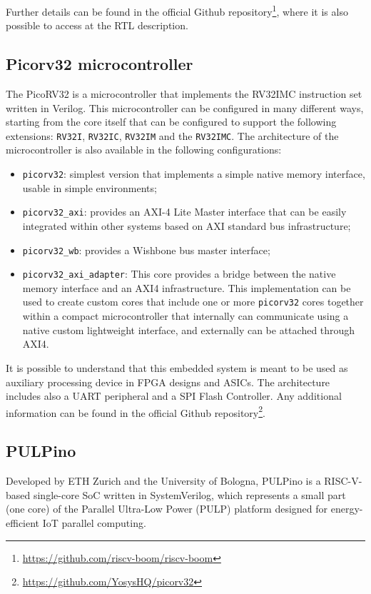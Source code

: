Further details can be found in the official Github repository\footnote{\url{https://github.com/riscv-boom/riscv-boom}}, where it is also possible to access at the RTL description.

\subsection{Picorv32 microcontroller}
The PicoRV32 is a microcontroller that implements the RV32IMC instruction set written in Verilog. This microcontroller can be configured in many different ways, starting from the core itself that can be configured to support the following extensions: \texttt{RV32I}, \texttt{RV32IC}, \texttt{RV32IM} and the \texttt{RV32IMC}. The architecture of the microcontroller is also available in the following configurations:

\begin{itemize}
\item \texttt{picorv32}: simplest version that implements a simple native memory interface, usable in simple environments;
\item \texttt{picorv32\_axi}: provides an AXI-4 Lite Master interface that can be easily integrated within other systems based on AXI standard bus infrastructure;
\item \texttt{picorv32\_wb}: provides a Wishbone bus master interface;
\item \texttt{picorv32\_axi\_adapter}: This core provides a bridge between the native memory interface and an AXI4 infrastructure. This implementation can be used to create custom cores that include one or more \texttt{picorv32} cores together within a compact microcontroller that internally can communicate using a native custom lightweight interface, and externally can be attached through AXI4.
\end{itemize}

It is possible to understand that this embedded system is meant to be used as auxiliary processing device in FPGA designs and ASICs. The architecture includes also a UART peripheral and a SPI Flash Controller.
Any additional information can be found in the official Github repository\footnote{\url{https://github.com/YosysHQ/picorv32}}.

\subsection{PULPino}
Developed by ETH Zurich and the University of Bologna, PULPino is a RISC-V-based single-core SoC written in SystemVerilog, which represents a small part (one core) of the Parallel Ultra-Low Power (PULP) platform designed for energy-efficient IoT parallel computing.

